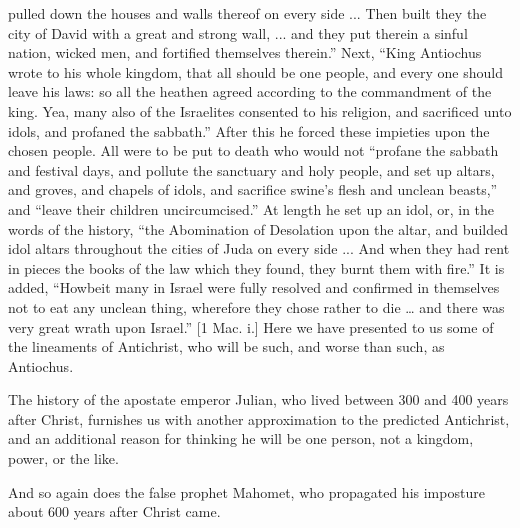 pulled down the houses and walls thereof on every side ... Then built
they the city of David with a great and strong wall, ... and they put
therein a sinful nation, wicked men, and fortified themselves
therein.'' Next, ``King Antiochus wrote to his whole
kingdom, that all should be one people, and every one should leave his
laws: so all the heathen agreed according to the commandment of the
king. Yea, many also of the Israelites consented to his religion, and
sacrificed unto idols, and profaned the sabbath.'' After this he
forced these impieties upon the chosen people. All were to be put to
death who would not ``profane the sabbath and festival days, and
pollute the sanctuary and holy people, and set up altars, and groves,
and chapels of idols, and sacrifice swine's flesh and unclean
beasts,'' and ``leave their children uncircumcised.'' At
length he set up an idol, or, in the words of the history, ``the
Abomination of Desolation upon the altar, and builded idol altars
throughout the cities of Juda on every side ... And when they had rent
in pieces the books of the law which they found, they burnt them with
fire.'' It is added, ``Howbeit many in Israel were fully
resolved and confirmed in themselves not to eat any unclean thing,
wherefore they chose rather to die … and there was very great wrath
upon Israel.'' [1 Mac. i.] Here we have presented to us some of
the lineaments of Antichrist, who will be such, and worse than such,
as Antiochus.

The history of the apostate emperor Julian, who lived between 300
and 400 years after Christ, furnishes us with another approximation to
the predicted Antichrist, and an additional reason for thinking he
will be one person, not a kingdom, power, or the like.

And so again does the false prophet Mahomet, who propagated his
imposture about 600 years after Christ came.

